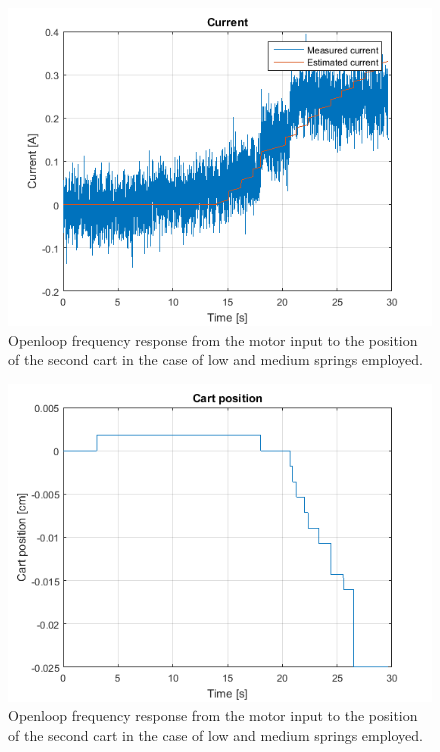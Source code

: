 \begin{figure}[h]
\centering
\includegraphics[width=0.5\linewidth]{img/static_fric_1}
\caption{Openloop frequency response from the motor input to the position of the second cart in the case of low and medium springs employed.}
\label{fig:sfric1}
\end{figure}
\begin{figure}[h]
\centering
\includegraphics[width=0.5\linewidth]{img/static_fric_2}
\caption{Openloop frequency response from the motor input to the position of the second cart in the case of low and medium springs employed.}
\label{fig:sfric2}
\end{figure}

